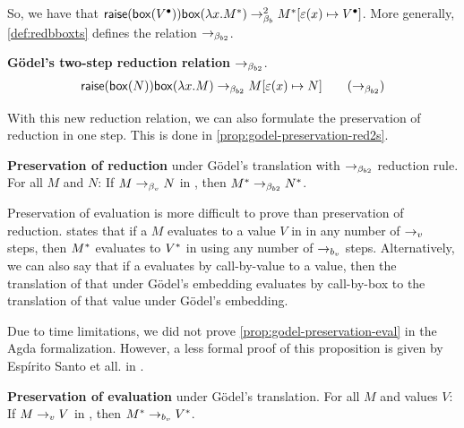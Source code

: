 So, we have that $\textsf{raise}({\mathsf{box}({{V}^\bullet})}) \mathsf{box}({\lambda {x}.{{M}^*}}) \to_{\beta_b}^2 {M}^* [{\varepsilon(x)}\mapsto{{V}^\bullet}]$.
More generally, \cref{def:redbboxts} defines the relation $\to_{\beta_{b2}}$.

\begin{definition}
  \label{def:redbboxts}
  \textbf{Gödel's two-step reduction relation \boldmath${\to_{\beta_{b2}}}$}.
  \begin{align*}
 \textsf{raise}({\mathsf{box}({N})}) \mathsf{box}({\lambda {x}.{M}}) \to_{\beta_{b2}} M [{\varepsilon(x)}\mapsto{N}]\quad \quad (\to_{\beta_{b2}})
  \end{align*}
\end{definition}

With this new reduction relation, we can also formulate the preservation of reduction in one step.
This is done in \cref{prop:godel-preservation-red2s}.

\begin{proposition}
  \label{prop:godel-preservation-red2s}
  \textbf{Preservation of reduction} under Gödel's translation with $\to_{\beta_{b2}}$ reduction rule.
 For all \lterms $M$ and $N$: 
  \center 
 If $M \to_{\beta_v} N$ in \lav, then ${M}^* \to_{\beta_{b2}} {N}^*$.
\end{proposition}

Preservation of evaluation is more difficult to prove than preservation of reduction.
 states that if a \lterm $M$ evaluates to a value $V$ in \lav in any number of $\to_v$ steps, 
then ${M}^*$ evaluates to ${V}^*$ in \lab using any number of $\to_{b_v}$ steps.
Alternatively, we can also say that if a \lterm evaluates by call-by-value to a value, 
then the translation of that \lterm under Gödel's embedding evaluates by call-by-box to the translation of that value under Gödel's embedding.

Due to time limitations, we did not prove \cref{prop:godel-preservation-eval} in the Agda formalization.
However, a less formal proof of this proposition is given by Espírito Santo et all. in \cite{espritosanto_et_al:LIPIcs:2019:10525}.

\begin{proposition}
  \label{prop:godel-preservation-eval}
  \textbf{Preservation of evaluation} under Gödel's translation.
 For all \lterms $M$ and values $V$: 
  \center  
 If $M \to_v V$ in \lav, then ${M}^* \to_{b_v} {V}^*$.
\end{proposition}
